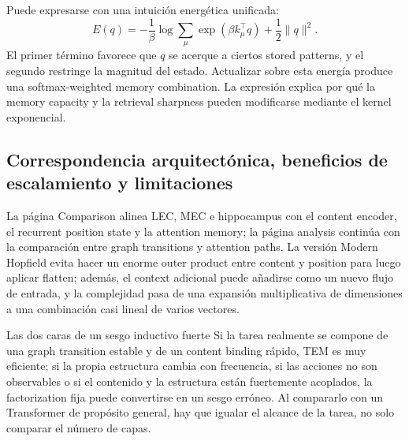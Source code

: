 Puede expresarse con una intuición energética unificada:
$$
E(q)=-\frac{1}{\beta}\log\sum_{\mu}\exp(\beta k_\mu^{\top}q)
+\frac{1}{2}\|q\|^2.
$$
El primer término favorece que $q$ se acerque a ciertos stored patterns, y el segundo restringe la magnitud del estado. Actualizar sobre esta energía produce una softmax-weighted memory combination. La expresión explica por qué la memory capacity y la retrieval sharpness pueden modificarse mediante el kernel exponencial.

\subsection{Correspondencia arquitectónica, beneficios de escalamiento y limitaciones}

La página Comparison alinea LEC, MEC e hippocampus con el content encoder, el recurrent position state y la attention memory; la página analysis continúa con la comparación entre graph transitions y attention paths. La versión Modern Hopfield evita hacer un enorme outer product entre content y position para luego aplicar flatten; además, el context adicional puede añadirse como un nuevo flujo de entrada, y la complejidad pasa de una expansión multiplicativa de dimensiones a una combinación casi lineal de varios vectores.




\begin{warningbox}{Las dos caras de un sesgo inductivo fuerte}
Si la tarea realmente se compone de una graph transition estable y de un content binding rápido, TEM es muy eficiente; si la propia estructura cambia con frecuencia, si las acciones no son observables o si el contenido y la estructura están fuertemente acoplados, la factorization fija puede convertirse en un sesgo erróneo. Al compararlo con un Transformer de propósito general, hay que igualar el alcance de la tarea, no solo comparar el número de capas.
\end{warningbox}

